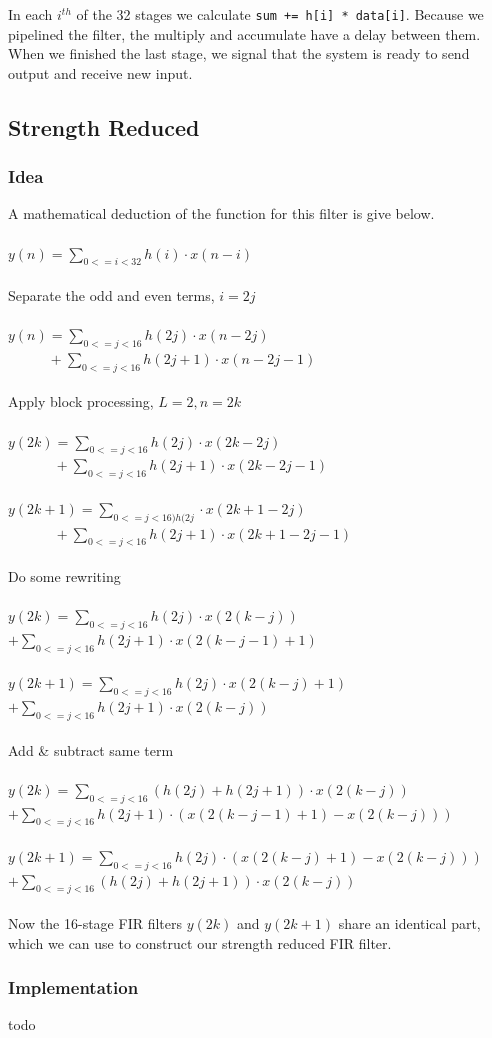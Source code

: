 In each $i^{th}$ of the 32 stages we calculate \texttt{sum += h[i] * data[i]}. Because we pipelined the filter, the multiply and accumulate have a delay between them. When we finished the last stage, we signal that the system is ready to send output and receive new input.
\subsection{Strength Reduced }
\subsubsection{Idea}
A mathematical deduction of the function for this filter is give below.\\
\\
$y(n) = \sum_{0<=i<32} h(i) \cdot x(n-i)$\\
\\
Separate the odd and even terms, $ i=2j$\\
\\
$y(n) = \sum_{0<=j<16} h(2j) \cdot x(n-2j)$\\
$\phantom{y(n)} + \sum_{0<=j<16} h(2j+1) \cdot x(n-2j-1)$\\
\\
Apply block processing, $L=2, n=2k$\\
\\
$y(2k)   = \sum_{0<=j<16} h(2j) \cdot x(2k-2j)$\\
$\phantom{y(2k)}       + \sum_{0<=j<16} h(2j+1) \cdot x(2k-2j-1)$\\
\\
$y(2k+1) = \sum_{0<=j<16) h(2j} \cdot x(2k+1-2j)$\\
$\phantom{y(2k)}        + \sum_{0<=j<16} h(2j+1) \cdot x(2k+1-2j-1)$\\
\\
Do some rewriting\\
\\
$y(2k)   = \sum_{0<=j<16} h(2j) \cdot x(2(k-j))$\\
$       + \sum_{0<=j<16} h(2j+1) \cdot x(2(k-j-1)+1)$\\
\\
$y(2k+1) = \sum_{0<=j<16} h(2j) \cdot x(2(k-j)+1)$\\
$        + \sum_{0<=j<16} h(2j+1) \cdot x(2(k-j))$\\
\\
Add \& subtract same term\\
\\
$y(2k)   = \sum_{0<=j<16} (h(2j) + h(2j+1)) \cdot x(2(k-j))$\\
$        + \sum_{0<=j<16} h(2j+1) \cdot (x(2(k-j-1)+1) - x(2(k-j)))$\\
\\
$y(2k+1) = \sum_{0<=j<16} h(2j) \cdot (x(2(k-j)+1) - x(2(k-j)))$\\
$        + \sum_{0<=j<16} (h(2j) + h(2j+1)) \cdot x(2(k-j))$\\
\\
Now the 16-stage FIR filters $y(2k)$ and $y(2k+1)$ share an identical part, which we can use to construct our strength reduced FIR filter.

\subsubsection{Implementation}
todo

